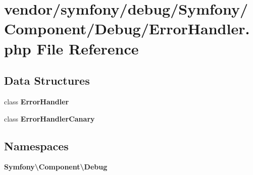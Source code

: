 \section{vendor/symfony/debug/\+Symfony/\+Component/\+Debug/\+Error\+Handler.php File Reference}
\label{symfony_2debug_2_symfony_2_component_2_debug_2_error_handler_8php}
\subsection*{Data Structures}
\begin{DoxyCompactItemize}
\item 
class {\bf Error\+Handler}
\item 
class {\bf Error\+Handler\+Canary}
\end{DoxyCompactItemize}
\subsection*{Namespaces}
\begin{DoxyCompactItemize}
\item 
 {\bf Symfony\textbackslash{}\+Component\textbackslash{}\+Debug}
\end{DoxyCompactItemize}
